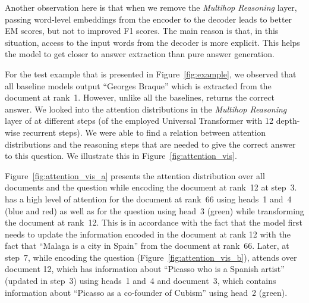 Another observation here is that when we remove the \emph{Multihop Reasoning} layer, passing word-level embeddings from the encoder to the decoder leads to better EM scores, but not to improved F1 scores. 
The main reason is that, in this situation, access to the input words from the decoder is more explicit. 
This helps the model to get closer to answer extraction than pure answer generation.

For the test example that is presented in Figure~\ref{fig:example}, we observed that all baseline models output ``Georges Braque'' which is extracted from the document at rank~1. 
However, unlike all the baselines, \tracrnet returns the correct answer. 
We looked into the attention distributions in the \emph{Multihop Reasoning} layer of \tracrnet at different steps (of the employed Universal Transformer with 12 depth-wise recurrent steps). 
We were able to find a relation between attention distributions and the reasoning steps that are needed to give the correct answer to this question. 
We illustrate this in Figure~\ref{fig:attention_vis}.

Figure~\ref{fig:attention_vis_a} presents the attention distribution over all documents and the question while encoding the document at rank~12 at step~3. 
\tracrnet has a high level of attention for the document at rank~66 using heads~1 and~4 (blue and red) as well as for the question using head~3 (green) while transforming the document at rank~12. 
This is in accordance with the fact that the model first needs to update the information encoded in the document at rank 12 with the fact that ``Malaga is a city in Spain'' from the document at rank~66. 
Later, at step~7, while encoding the question (Figure~\ref{fig:attention_vis_b}), \tracrnet attends over document 12, which has information about ``Picasso who is a Spanish artist'' (updated in step~3) using heads~1 and~4 and document~3, which contains information about ``Picasso as a co-founder of Cubism'' using head~2 (green). 


